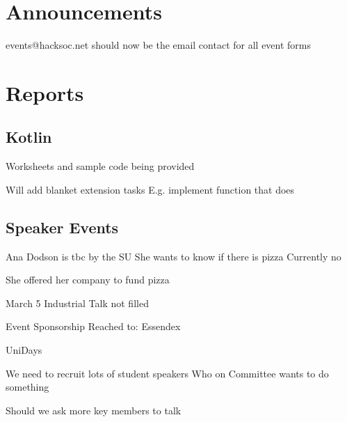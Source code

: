 \documentclass[11pt,hacksoc]{meetingmins}
\begin{document}
\maketitle

\section{Announcements}
\begin{items}
\item
events@hacksoc.net should now be the email contact for all event forms

\end{items}

\section{Reports}

\subsection{Kotlin}
\begin{hiddensubitems}
	\item
	Worksheets and sample code being provided
	
	\item
	Will add blanket extension tasks
		\subitem
		E.g. implement function that does
		
	\item
\end{hiddensubitems}

\subsection{Speaker Events}
\begin{hiddensubitems}
	\item
	Ana Dodson is tbc by the SU
		\subitem
		She wants to know if there is pizza
			\subsubitem
			Currently no
			
		\subitem
		She offered her company to fund pizza
		
	\item
	March 5 Industrial Talk not filled
		\subitem
	
	\item
	Event Sponsorship
		\subitem
		Reached to:
			\subsubitem
			Essendex
			
			\subsubitem
			UniDays
	
	\item
	We need to recruit lots of student speakers
		\subitem
		Who on Committee wants to do something
		
		\subitem
		Should we ask more key members to talk
	
	
\end{hiddensubitems}
\end{document}
